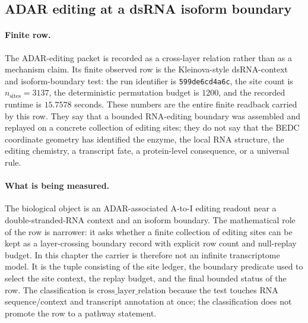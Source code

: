 \subsection{ADAR editing at a dsRNA isoform boundary}
\label{sec:bioreality-adar-editing-dsrna-context-isoform-boundary-kleinova2023}

\paragraph{Finite row.}
The ADAR-editing packet is recorded as a cross-layer relation rather than as a mechanism claim.  Its finite observed row is the Kleinova-style dsRNA-context and isoform-boundary test: the run identifier is \texttt{599de6cd4a6c}, the site count is $n_{\mathrm{sites}}=3137$, the deterministic permutation budget is $1200$, and the recorded runtime is $15.7578$ seconds.  These numbers are the entire finite readback carried by this row.  They say that a bounded RNA-editing boundary was assembled and replayed on a concrete collection of editing sites; they do not say that the BEDC coordinate geometry has identified the enzyme, the local RNA structure, the editing chemistry, a transcript fate, a protein-level consequence, or a universal rule.

\paragraph{What is being measured.}
The biological object is an ADAR-associated A-to-I editing readout near a double-stranded-RNA context and an isoform boundary.  The mathematical role of the row is narrower: it asks whether a finite collection of editing sites can be kept as a layer-crossing boundary record with explicit row count and null-replay budget.  In this chapter the carrier is therefore not an infinite transcriptome model.  It is the tuple consisting of the site ledger, the boundary predicate used to select the site context, the replay budget, and the final bounded status of the row.  The classification is $\mathrm{cross\_layer\_relation}$ because the test touches RNA sequence/context and transcript annotation at once; the classification does not promote the row to a pathway statement.

